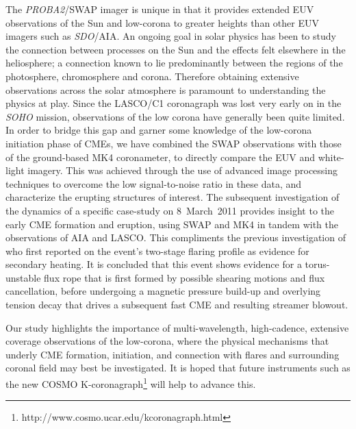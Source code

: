 \documentclass[namedreferences]{solarphysics}
\begin{document}
\begin{article}
{The \emph{PROBA2}/SWAP imager is unique in that it provides extended EUV observations of the Sun and low-corona to greater heights than other EUV imagers such as \emph{SDO}/AIA. An ongoing goal in solar physics has been to study the connection between processes on the Sun and the effects felt elsewhere in the heliosphere; a connection known to lie predominantly between the regions of the photosphere, chromosphere and corona. Therefore obtaining extensive observations across the solar atmosphere is paramount to understanding the physics at play. Since the LASCO/C1 coronagraph was lost very early on in the \emph{SOHO} mission, observations of the low corona have generally been quite limited. In order to bridge this gap and garner some knowledge of the low-corona initiation phase of CMEs, we have combined the SWAP observations with those of the ground-based MK4 coronameter, to directly compare the EUV and white-light imagery. This was achieved through the use of advanced image processing techniques to overcome the low signal-to-noise ratio in these data, and characterize the erupting structures of interest. The subsequent investigation of the dynamics of a specific case-study on 8~March~2011 provides insight to the early CME formation and eruption, using SWAP and MK4 in tandem with the observations of AIA and LASCO. This compliments the previous investigation of  who first reported on the event's two-stage flaring profile as evidence for secondary heating. It is concluded that this event shows evidence for a torus-unstable flux rope that is first formed by possible shearing motions and flux cancellation, before undergoing a magnetic pressure build-up and overlying tension decay that drives a subsequent fast CME and resulting streamer blowout. 

Our study highlights the importance of multi-wavelength, high-cadence, extensive coverage observations of the low-corona, where the physical mechanisms that underly CME formation, initiation, and connection with flares and surrounding coronal field may best be investigated. It is hoped that future instruments such as the new COSMO K-coronagraph\footnote{http://www.cosmo.ucar.edu/kcoronagraph.html} will help to advance this.

}




%




\end{article}
\end{document}

